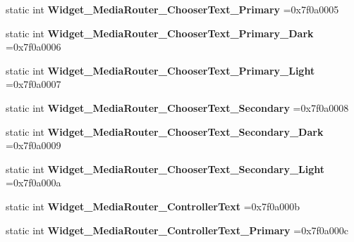 \begin{DoxyCompactItemize}
static int {\bfseries Widget\+\_\+\+Media\+Router\+\_\+\+Chooser\+Text\+\_\+\+Primary} =0x7f0a0005
\item 
\mbox{\label{classandroid_1_1support_1_1v7_1_1cardview_1_1R_1_1style_ae2eb31ff9e5a6ce09e75b671c64f3176}} 
static int {\bfseries Widget\+\_\+\+Media\+Router\+\_\+\+Chooser\+Text\+\_\+\+Primary\+\_\+\+Dark} =0x7f0a0006
\item 
\mbox{\label{classandroid_1_1support_1_1v7_1_1cardview_1_1R_1_1style_a4281a3aff8397347a2b62d29fa2ca472}} 
static int {\bfseries Widget\+\_\+\+Media\+Router\+\_\+\+Chooser\+Text\+\_\+\+Primary\+\_\+\+Light} =0x7f0a0007
\item 
\mbox{\label{classandroid_1_1support_1_1v7_1_1cardview_1_1R_1_1style_ae1a60995a935bdd36aa8be5cf792fb43}} 
static int {\bfseries Widget\+\_\+\+Media\+Router\+\_\+\+Chooser\+Text\+\_\+\+Secondary} =0x7f0a0008
\item 
\mbox{\label{classandroid_1_1support_1_1v7_1_1cardview_1_1R_1_1style_a57dd4a3abc5a641106847fff15adb167}} 
static int {\bfseries Widget\+\_\+\+Media\+Router\+\_\+\+Chooser\+Text\+\_\+\+Secondary\+\_\+\+Dark} =0x7f0a0009
\item 
\mbox{\label{classandroid_1_1support_1_1v7_1_1cardview_1_1R_1_1style_a9c5233c3b126334609135c20f049fbfb}} 
static int {\bfseries Widget\+\_\+\+Media\+Router\+\_\+\+Chooser\+Text\+\_\+\+Secondary\+\_\+\+Light} =0x7f0a000a
\item 
\mbox{\label{classandroid_1_1support_1_1v7_1_1cardview_1_1R_1_1style_abd47831568907f6e6839d0b8031e9a4c}} 
static int {\bfseries Widget\+\_\+\+Media\+Router\+\_\+\+Controller\+Text} =0x7f0a000b
\item 
\mbox{\label{classandroid_1_1support_1_1v7_1_1cardview_1_1R_1_1style_a178b56f2dd855e8e8a4a1108d38b1276}} 
static int {\bfseries Widget\+\_\+\+Media\+Router\+\_\+\+Controller\+Text\+\_\+\+Primary} =0x7f0a000c

\end{DoxyCompactItemize}
